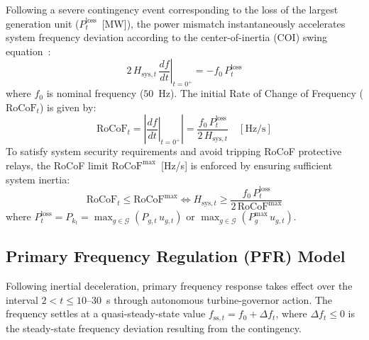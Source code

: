 \documentclass[journal]{IEEEtran}
\begin{document}
Following a severe contingency event corresponding to the loss of the largest generation unit ($P^{\text{loss}}_t$~[MW]), the power mismatch instantaneously accelerates system frequency deviation according to the center-of-inertia (COI) swing equation~\cite{Anderson1990}:
\begin{equation}
  2\,H_{\text{sys},t}\,\left.\frac{df}{dt}\right|_{t=0^+} = -f_0\,P^{\text{loss}}_t
  \label{eq:swing}
\end{equation}
where $f_0$ is nominal frequency ($50$~Hz). The initial Rate of Change of Frequency ($\text{RoCoF}_t$) is given by:
\begin{equation}
  \text{RoCoF}_t = \left|\left.\frac{df}{dt}\right|_{t=0^+}\right| = \frac{f_0\,P^{\text{loss}}_t}{2\,H_{\text{sys},t}} \quad [\text{Hz/s}]
  \label{eq:rocof_def}
\end{equation}
To satisfy system security requirements and avoid tripping RoCoF protective relays, the RoCoF limit $\text{RoCoF}^{\max}$~[Hz/s] is enforced by ensuring sufficient system inertia:
\begin{equation}
  \text{RoCoF}_t \leq \text{RoCoF}^{\max} \iff H_{\text{sys},t} \geq \frac{f_0\,P^{\text{loss}}_t}{2\,\text{RoCoF}^{\max}}
  \label{eq:rocof_bound}
\end{equation}
where $P^{\text{loss}}_t = P_{k_t} = \max_{g \in \mathcal{G}} (P_{g,t}\,u_{g,t})$ or $\max_{g \in \mathcal{G}} (P_g^{\max}\,u_{g,t})$.

\subsection{Primary Frequency Regulation (PFR) Model}

Following inertial deceleration, primary frequency response takes effect over the interval $2 < t \leq 10$--$30$~s through autonomous turbine-governor action. The frequency settles at a quasi-steady-state value $f_{\text{ss},t} = f_0 + \Delta f_t$, where $\Delta f_t \leq 0$ is the steady-state frequency deviation resulting from the contingency.
\end{document}

